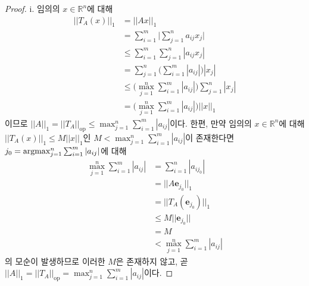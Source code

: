 \begin{proof}
    i. 임의의 $x\in\mathbb{R}^n$에 대해
    \begin{align*}
        ||T_A(x)||_1&=||Ax||_1\\
        &=\sum_{i=1}^m\bigg|\sum_{j=1}^na_{ij}x_j\bigg|\\
        &\leq\sum_{i=1}^m\sum_{j=1}^n|a_{ij}x_j|\\
        &=\sum_{j=1}^n\bigg(\sum_{i=1}^m|a_{ij}|\bigg)|x_j|\\
        &\leq\bigg(\max_{j=1}^n\sum_{i=1}^m|a_{ij}|\bigg)\sum_{j=1}^n|x_j|\\
        &=\bigg(\max_{j=1}^n\sum_{i=1}^m|a_{ij}|\bigg)||x||_1
    \end{align*}
    이므로 $||A||_1=||T_A||_\mathrm{op}\leq\max_{j=1}^n\sum_{i=1}^m|a_{ij}|$이다. 한편, 만약 임의의 $x\in\mathbb{R}^n$에 대해 $||T_A(x)||_1\leq M||x||_1$인 $M<\max_{j=1}^n\sum_{i=1}^m|a_{ij}|$이 존재한다면 $j_0=\mathrm{argmax}_{j=1}^n\sum_{i=1}^m|a_{ij}|$에 대해
    \begin{align*}
        \max_{j=1}^n\sum_{i=1}^m|a_{ij}|&=\sum_{i=1}^n|a_{ij_0}|\\
        &=||A\mathbf{e}_{j_0}||_1\\
        &=||T_A(\mathbf{e}_{j_0})||_1\\
        &\leq M||\mathbf{e}_{j_0}||\\
        &=M\\
        &<\max_{j=1}^n\sum_{i=1}^m|a_{ij}|
    \end{align*}
    의 모순이 발생하므로 이러한 $M$은 존재하지 않고, 곧 $||A||_1=||T_A||_\mathrm{op}=\max_{j=1}^n\sum_{i=1}^m|a_{ij}|$이다.


\end{proof}

